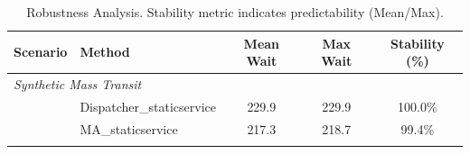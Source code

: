 \begin{table}[h]
\centering
\caption{Robustness Analysis. Stability metric indicates predictability (Mean/Max).}
\label{tab:robustness}
\begin{tabular}{llcc|c}
\toprule
\textbf{Scenario} & \textbf{Method} & \textbf{Mean Wait} & \textbf{Max Wait} & \textbf{Stability (\%)} \\
\midrule
\multicolumn{5}{l}{\textit{Synthetic Mass Transit}} \\
 & Dispatcher_staticservice & 229.9 & 229.9 & 100.0\% \\
 & MA_staticservice & 217.3 & 218.7 & 99.4\% \\
\addlinespace
\bottomrule
\end{tabular}
\end{table}